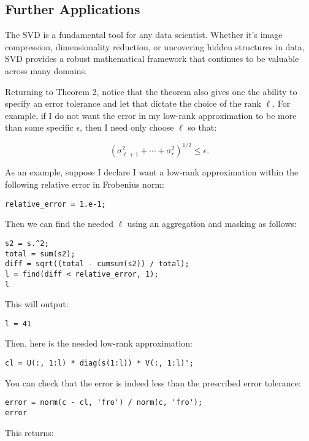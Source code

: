 \documentclass{ximera}
\begin{document}
\begin{problem}
\begin{problem}
\section{Further Applications}

The SVD is a fundamental tool for any data scientist. Whether it’s image compression, dimensionality reduction, or uncovering hidden structures in data, SVD provides a robust mathematical framework that continues to be valuable across many domains.

Returning to Theorem 2, notice that the theorem also gives one the ability to specify an error tolerance and let that dictate the choice of the rank \( \ell \). For example, if I do not want the error in my low-rank approximation to be more than some specific \( \epsilon \), then I need only choose \( \ell \) so that:

\[
\left( \sigma_{\ell+1}^2 + \cdots + \sigma_{r}^2 \right)^{1/2} \leq \epsilon.
\]

As an example, suppose I declare I want a low-rank approximation within the following relative error in Frobenius norm:

\begin{verbatim}
relative_error = 1.e-1;
\end{verbatim}

Then we can find the needed \( \ell \) using an aggregation and masking as follows:

\begin{verbatim}
s2 = s.^2;
total = sum(s2);
diff = sqrt((total - cumsum(s2)) / total);
l = find(diff < relative_error, 1);
l
\end{verbatim}

This will output:

\begin{verbatim}
l = 41
\end{verbatim}

Then, here is the needed low-rank approximation:

\begin{verbatim}
cl = U(:, 1:l) * diag(s(1:l)) * V(:, 1:l)';
\end{verbatim}

You can check that the error is indeed less than the prescribed error tolerance:

\begin{verbatim}
error = norm(c - cl, 'fro') / norm(c, 'fro');
error
\end{verbatim}

This returns:


\end{problem}
\end{problem}
\end{document}
